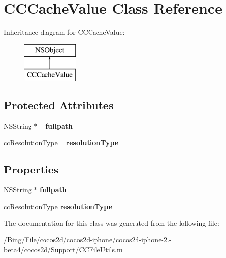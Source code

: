\hypertarget{interface_c_c_cache_value}{\section{C\-C\-Cache\-Value Class Reference}
\label{interface_c_c_cache_value}
}
Inheritance diagram for C\-C\-Cache\-Value\-:\begin{figure}[H]
\begin{center}
\leavevmode
\includegraphics[height=2.000000cm]{interface_c_c_cache_value}
\end{center}
\end{figure}
\subsection*{Protected Attributes}
\begin{DoxyCompactItemize}
\item 
\hypertarget{interface_c_c_cache_value_a709938d3733483e6677440333a3af6f2}{N\-S\-String $\ast$ {\bfseries \-\_\-fullpath}}\label{interface_c_c_cache_value_a709938d3733483e6677440333a3af6f2}

\item 
\hypertarget{interface_c_c_cache_value_a2cc1998214b2046deabd36e803df4206}{\hyperlink{cc_types_8h_a3fccc5ae3efabdf2bb0aebafe9620f5d}{cc\-Resolution\-Type} {\bfseries \-\_\-resolution\-Type}}\label{interface_c_c_cache_value_a2cc1998214b2046deabd36e803df4206}

\end{DoxyCompactItemize}
\subsection*{Properties}
\begin{DoxyCompactItemize}
\item 
\hypertarget{interface_c_c_cache_value_a830debe1995643d67dc26634c44facc2}{N\-S\-String $\ast$ {\bfseries fullpath}}\label{interface_c_c_cache_value_a830debe1995643d67dc26634c44facc2}

\item 
\hypertarget{interface_c_c_cache_value_ad27f4737397d1132745ac1f8126e5155}{\hyperlink{cc_types_8h_a3fccc5ae3efabdf2bb0aebafe9620f5d}{cc\-Resolution\-Type} {\bfseries resolution\-Type}}\label{interface_c_c_cache_value_ad27f4737397d1132745ac1f8126e5155}

\end{DoxyCompactItemize}


The documentation for this class was generated from the following file\-:\begin{DoxyCompactItemize}
\item 
/\-Bing/\-File/cocos2d/cocos2d-\/iphone/cocos2d-\/iphone-\/2.-\/beta4/cocos2d/\-Support/C\-C\-File\-Utils.\-m\end{DoxyCompactItemize}
